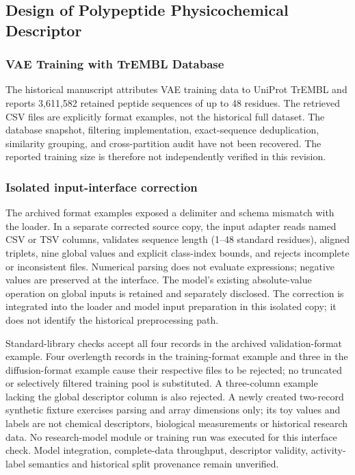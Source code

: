 \documentclass[journal]{IEEEtran}
\begin{document}
\subsection{Design of Polypeptide Physicochemical Descriptor}

\subsubsection{VAE Training with TrEMBL Database}

The historical manuscript attributes VAE training data to UniProt TrEMBL and reports 3,611,582 retained peptide sequences of up to 48 residues. The retrieved CSV files are explicitly format examples, not the historical full dataset. The database snapshot, filtering implementation, exact-sequence deduplication, similarity grouping, and cross-partition audit have not been recovered. The reported training size is therefore not independently verified in this revision.

\subsubsection{Isolated input-interface correction}
The archived format examples exposed a delimiter and schema mismatch with the loader. In a separate corrected source copy, the input adapter reads named CSV or TSV columns, validates sequence length (1--48 standard residues), aligned triplets, nine global values and explicit class-index bounds, and rejects incomplete or inconsistent files. Numerical parsing does not evaluate expressions; negative values are preserved at the interface. The model's existing absolute-value operation on global inputs is retained and separately disclosed. The correction is integrated into the loader and model input preparation in this isolated copy; it does not identify the historical preprocessing path.

Standard-library checks accept all four records in the archived validation-format example. Four overlength records in the training-format example and three in the diffusion-format example cause their respective files to be rejected; no truncated or selectively filtered training pool is substituted. A three-column example lacking the global descriptor column is also rejected. A newly created two-record synthetic fixture exercises parsing and array dimensions only; its toy values and labels are not chemical descriptors, biological measurements or historical research data. No research-model module or training run was executed for this interface check. Model integration, complete-data throughput, descriptor validity, activity-label semantics and historical split provenance remain unverified.
\end{document}
